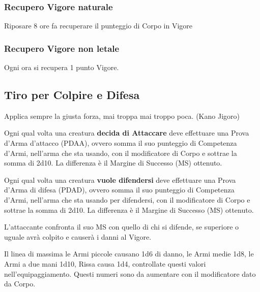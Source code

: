 \documentclass[12pt,a4paper,twoside,openany]{book}
\begin{document}
\begin{multicols}{2}
\subsubsection{Recupero Vigore naturale}\label{recuperopuntiferitanaturale} 

Riposare 8 ore fa recuperare il punteggio di Corpo in Vigore

\subsubsection{Recupero Vigore non letale}\label{recuperopuntiferitanonletali}\hypertarget{recuperopuntiferitanonletali}{}

Ogni ora si recupera 1 punto Vigore.

\subsection{Tiro per Colpire e Difesa}\label{tiropercolpireedifesa}

\begin{changemargin}{0.3cm}{0.3cm}\begin{enfasi}{Applica sempre la giusta forza, mai troppa mai troppo poca. (Kano Jigoro)}\end{enfasi}\end{changemargin}\medskip

Ogni qual volta una creatura \textbf{decida di Attaccare} deve effettuare una Prova d'Arma d'attacco (PDAA), ovvero somma il suo punteggio di Competenza d'Armi, nell'arma che sta usando, con il modificatore di Corpo e sottrae la somma di 2d10. La differenza è il Margine di Successo (MS) ottenuto.

Ogni qual volta una creatura \textbf{vuole difendersi} deve effettuare una Prova d'Arma di difesa (PDAD), ovvero somma il suo punteggio di Competenza d'Armi, nell'arma che sta usando per difendersi, con il modificatore di Corpo e sottrae la somma di 2d10. La differenza è il Margine di Successo (MS) ottenuto.

L'attaccante confronta il suo MS con quello di chi si difende, se superiore o uguale avrà colpito e causerà i danni al Vigore.

Il linea di massima le Armi piccole causano 1d6 di danno, le Armi medie 1d8, le Armi a due mani 1d10, Rissa causa 1d4, controllate questi valori nell'equipaggiamento. Questi numeri sono da aumentare con il modificatore dato da Corpo.


\end{multicols}
\end{document}
